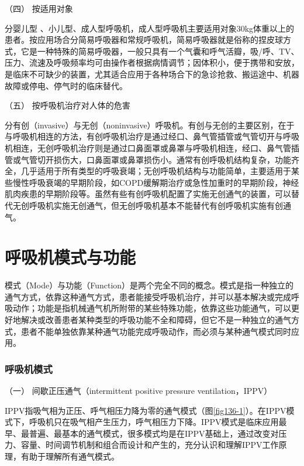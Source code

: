 \hypertarget{text00367.htmlux5cux23CHP16-3-1-2-4}{}
（四） 按适用对象

分婴儿型
、小儿型、成人型呼吸机，成人型呼吸机主要适用对象30kg体重以上的患者。按应用场合分简易呼吸器和常规呼吸机，简易呼吸器就是俗称的捏皮球方式，它是一种特殊的简易呼吸器，一般只具有一个气囊和呼气活瓣，吸/呼、TV、压力、流速及呼吸频率均可由操作者根据病情调节；因体积小，便于携带和安放，是临床不可缺少的装置，尤其适合应用于各种场合下的急诊抢救、搬运途中、机器故障或停电、停气时的临床替代。

\hypertarget{text00367.htmlux5cux23CHP16-3-1-2-5}{}
（五） 按呼吸机治疗对人体的危害

分有创（invasive）与无创（noninvasive）呼吸机。有创与无创的主要区别，在于与呼吸机相连的方法，有创呼吸机治疗是通过经口、鼻气管插管或气管切开与呼吸机相连，无创呼吸机治疗则是通过口鼻面罩或鼻罩与呼吸机相连，经口、鼻气管插管或气管切开损伤大，口鼻面罩或鼻罩损伤小。通常有创呼吸机结构复杂，功能齐全，几乎适用于所有类型的呼吸衰竭；无创呼吸机结构与功能简单，主要适用于某些慢性呼吸衰竭的早期阶段，如COPD缓解期治疗或急性加重时的早期阶段，神经肌肉疾患的早期阶段等。虽然有些有创呼吸机配置了实施无创通气的装置，可以替代无创呼吸机实施无创通气，但无创呼吸机基本不能替代有创呼吸机实施有创通气。

\protect\hypertarget{text00368.html}{}{}

\section{呼吸机模式与功能}

模式（Mode）与功能（Function）是两个完全不同的概念。模式是指一种独立的通气方式，依靠这种通气方式，患者能接受呼吸机治疗，并可以基本解决或完成呼吸动作；功能是指机械通气机所附带的某些特殊功能，依靠这些功能通气，可以更好地解决或改善患者某种类型的呼吸功能不全和障碍，但它不是一种独立的通气方式，患者不能单独依靠某种通气功能完成呼吸动作，而必须与某种通气模式同时应用。

\subsubsection{呼吸机模式}

\hypertarget{text00368.htmlux5cux23CHP16-3-2-1-1}{}
（一） 间歇正压通气（intermittent positive pressure ventilation，IPPV）

IPPV指吸气相为正压、呼气相压力降为零的通气模式（图\ref{fig136-1}）。在IPPV模式下，呼吸机只在吸气相产生压力，呼气相压力下降。IPPV模式是临床应用最早、最普遍、最基本的通气模式，很多模式均是在IPPV基础上，通过改变对压力、容量、时间调节机制和组合而设计和产生的，充分认识和理解IPPV工作原理，有助于理解所有通气模式。

